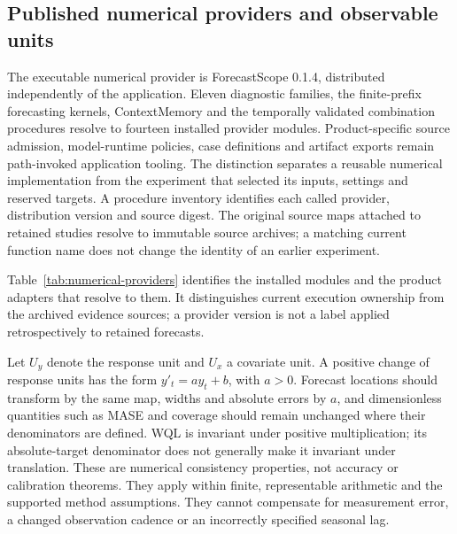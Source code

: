 \subsection{Published numerical providers and observable units}
\label{sec:observable-units}
The executable numerical provider is ForecastScope 0.1.4, distributed independently of the application. Eleven diagnostic families, the finite-prefix forecasting kernels, ContextMemory and the temporally validated combination procedures resolve to fourteen installed provider modules. Product-specific source admission, model-runtime policies, case definitions and artifact exports remain path-invoked application tooling. The distinction separates a reusable numerical implementation from the experiment that selected its inputs, settings and reserved targets. A procedure inventory identifies each called provider, distribution version and source digest. The original source maps attached to retained studies resolve to immutable source archives; a matching current function name does not change the identity of an earlier experiment.

Table~\ref{tab:numerical-providers} identifies the installed modules and the product adapters that resolve to them. It distinguishes current execution ownership from the archived evidence sources; a provider version is not a label applied retrospectively to retained forecasts.


Let \(U_y\) denote the response unit and \(U_x\) a covariate unit. A positive change of response units has the form \(y'_t=a y_t+b\), with \(a>0\). Forecast locations should transform by the same map, widths and absolute errors by \(a\), and dimensionless quantities such as MASE and coverage should remain unchanged where their denominators are defined. WQL is invariant under positive multiplication; its absolute-target denominator does not generally make it invariant under translation. These are numerical consistency properties, not accuracy or calibration theorems. They apply within finite, representable arithmetic and the supported method assumptions. They cannot compensate for measurement error, a changed observation cadence or an incorrectly specified seasonal lag.


